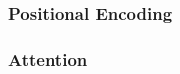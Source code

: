 \subsubsection{Positional Encoding}\label{sec:positional-encoding}

\subsubsection{Attention}\label{sec:attention}




